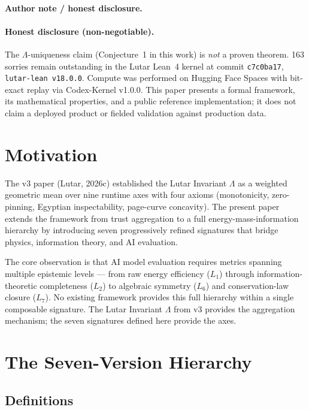 \documentclass[11pt]{article}
\theoremstyle{plain}
\begin{document}
\paragraph{Author note / honest disclosure.} \paragraph{Honest disclosure (non-negotiable).} The $\Lambda$-uniqueness claim (Conjecture~1 in this work) is \emph{not} a proven theorem. 163 sorries remain outstanding in the Lutar Lean~4 kernel at commit \texttt{c7c0ba17}, \texttt{lutar-lean v18.0.0}. Compute was performed on Hugging Face Spaces with bit-exact replay via Codex-Kernel v1.0.0. This paper presents a formal framework, its mathematical properties, and a public reference implementation; it does not claim a deployed product or fielded validation against production data.


\section{Motivation}

The v3 paper (Lutar, 2026c) established the Lutar Invariant \( \Lambda \) as a weighted geometric mean over nine runtime axes with four axioms (monotonicity, zero-pinning, Egyptian inspectability, page-curve concavity). The present paper extends the framework from trust aggregation to a full energy-mass-information hierarchy by introducing seven progressively refined signatures that bridge physics, information theory, and AI evaluation.

The core observation is that AI model evaluation requires metrics spanning multiple epistemic levels — from raw energy efficiency (\( L_1 \)) through information-theoretic completeness (\( L_2 \)) to algebraic symmetry (\( L_6 \)) and conservation-law closure (\( L_7 \)). No existing framework provides this full hierarchy within a single composable signature. The Lutar Invariant \( \Lambda \) from v3 provides the aggregation mechanism; the seven signatures defined here provide the axes.


\section{The Seven-Version Hierarchy}

\subsection{Definitions}
\end{document}
